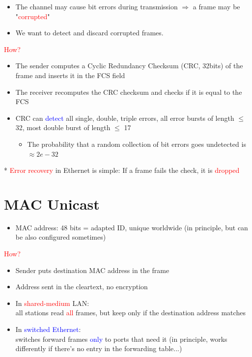 \documentclass[11pt]{article}
\begin{document}
\begin{itemize}
	\item The channel may cause bit errors during transmission $\Rightarrow$ a frame may be "\textcolor{red}{corrupted}"
	\item We want to detect and discard corrupted frames.
\end{itemize}
\textcolor{red}{How?}
\begin{itemize}
	\item The sender computes a Cyclic Redundancy Checksum (CRC, 32bits) of the frame and inserts it in the FCS field
	\item The receiver recomputes the CRC checksum and checks if it is equal to the FCS
	\item CRC can \textcolor{blue}{detect} all single, double, triple errors, all error bursts of length $\leq$ 32, most double burst of length  $\leq$ 17
		 \begin{itemize}
			\item The probability that a random collection of bit errors goes undetected is $\approx 2e-32$
		\end{itemize}
\end{itemize}

* \textcolor{red}{Error recovery} in Ethernet is simple: If a frame fails the check, it is \textcolor{red}{dropped}
\section*{MAC Unicast}

\begin{itemize}
	\item MAC address: 48 bits = adapted ID, unique worldwide (in principle, but can be also configured sometimes)
\end{itemize}

\textcolor{red}{How?}
\begin{itemize}
	\item Sender puts destination MAC address in the frame
	\item Address sent in the cleartext, no encryption
\end{itemize}

\begin{itemize}
	\item In \textcolor{red}{shared-medium} LAN: \\
	all stations read \textcolor{red}{all} frames, but keep only if the destination address matches
	\item In \textcolor{blue}{switched Ethernet}: \\
		switches forward frames \textcolor{blue}{only} to ports that need it (in principle, works differently if there's no entry in the forwarding table...)
\end{itemize}
\end{document}
